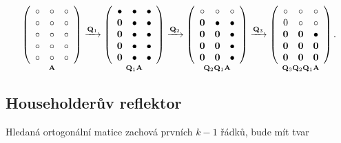 \[
\underset{\mA}{ \left({\begin{array}{*{20}c} \circ    & \circ    & \circ    \\ \circ    & \circ    & \circ    \\ \circ    & \circ    & \circ    \\ \circ    & \circ    & \circ    \\ \circ    & \circ    & \circ    \\ \end{array}} \right) }
\xrightarrow{\mQ_1}
\underset{\mQ_1 \mA}{ \left({\begin{array}{*{20}c} \bullet  & \bullet  & \bullet  \\ \mathbf{0}  & \bullet  & \bullet  \\ \mathbf{0}  & \bullet  & \bullet  \\ \mathbf{0}  & \bullet  & \bullet  \\ \mathbf{0}  & \bullet  & \bullet  \\ \end{array}} \right) }
\xrightarrow{\mQ_2}
\underset{\mQ_2 \mQ_1 \mA}{ \left({\begin{array}{*{20}c} \circ    & \circ    & \circ    \\ \mathbf{0}  & \bullet  & \bullet  \\ \mathbf{0}  & \mathbf{0}  & \bullet  \\ \mathbf{0}  & \mathbf{0}  & \bullet  \\ \mathbf{0}  & \mathbf{0}  & \bullet  \\ \end{array}} \right) }
\xrightarrow{\mQ_3}
\underset{\mQ_3 \mQ_2 \mQ_1 \mA}{ \left({\begin{array}{*{20}c} \circ    & \circ    & \circ    \\ 0       & \circ    & \circ    \\ \mathbf{0}  & \mathbf{0}  & \bullet  \\ \mathbf{0}  & \mathbf{0}  & \mathbf{0}  \\ \mathbf{0}  & \mathbf{0}  & \mathbf{0}  \\ \end{array}} \right) }\,.
\] 

\subsection*{Householderův reflektor}

Hledaná ortogonální matice zachová prvních $k-1$ řádků, bude mít tvar

